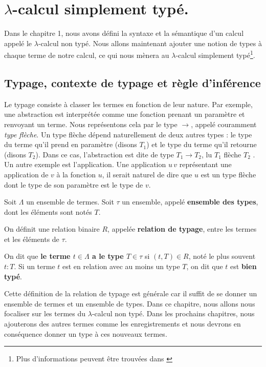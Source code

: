 \chapter{$\lambda$-calcul simplement typé.}

Dans le chapitre 1, nous avons défini la syntaxe et la sémantique d'un calcul
appelé le $\lambda$-calcul non typé. Nous allons maintenant ajouter une notion de types à
chaque terme de notre calcul, ce qui nous mènera au $\lambda$-calcul simplement
typé\footnote{Plus d'informations peuvent être trouvées dans \cite{tapl-simply-typed-lambda-calculus}}.

\section{Typage, contexte de typage et règle d'inférence}

Le typage consiste à classer les termes en fonction de leur nature. Par exemple,
une abstraction est interprétée comme une fonction prenant un paramètre et
renvoyant un terme. Nous représentons cela par le type $\rightarrow$, appelé
couramment \textit{type flèche}. Un type flèche dépend naturellement de deux autres types : le
type du terme qu'il prend en paramètre (disons $T_{1}$) et le type du terme
qu'il retourne (disons $T_{2}$). Dans ce cas, l'abstraction est dite de type
$T_{1} \rightarrow T_{2}$, lu \og $T_{1}$ flèche $T_{2}$ \fg. Un
autre exemple est l'application. Une application $u \, v$ représentant une
application de $v$ à la fonction $u$, il serait naturel de dire que $u$ est un
type flèche dont le type de son paramètre est le type de $v$.

\begin{definition} 
  \label{def:simply-typed-lambda-calculus-type-relation}
  Soit $\Lambda$ un ensemble de termes.
  Soit $\tau$ un ensemble, appelé \textbf{ensemble des types}, dont les éléments
  sont notés $T$.

  On définit une relation binaire $R$, appelée \textbf{relation de typage}, entre les
  termes et les éléments de $\tau$.
  
  On dit que \textbf{le terme $t \in \Lambda$ a le type $T \in \tau$} si $(t, T)
  \in R$, noté le plus souvent $t : T$. Si un terme $t$ est en relation avec au
  moins un type $T$, on dit que $t$ est \textbf{bien typé}.
\end{definition}

Cette définition de la relation de typage est générale car il suffit de se
donner un ensemble de termes et un ensemble de types. Dans ce chapitre, nous
allons nous focaliser sur les termes du $\lambda$-calcul non typé. Dans les
prochains chapitres, nous ajouterons des autres termes comme les enregistrements
et nous devrons en conséquence donner un type à ces nouveaux termes.

